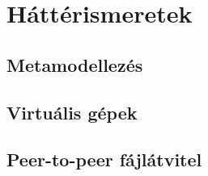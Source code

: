 \chapter{Háttérismeretek}

\section{Metamodellezés}

\section{Virtuális gépek}

\section{Peer-to-peer fájlátvitel}
